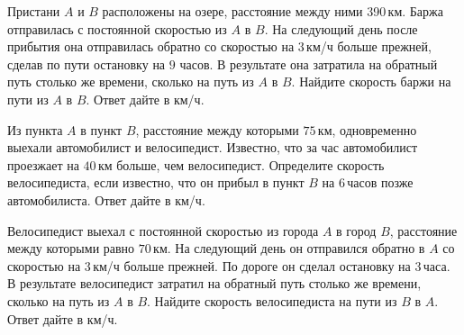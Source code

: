 \begin{class}[number=1]
\begin{listofex}
		\item Пристани \( A \) и \( B \) расположены на озере, расстояние между ними 390 км. Баржа отправилась с постоянной скоростью из \( A \) в \( B \). На следующий день после прибытия она отправилась обратно со скоростью на \( 3 \) км/ч больше прежней, сделав по пути остановку на \( 9 \) часов. В результате она затратила на обратный путь столько же времени, сколько на путь из \( A \) в \( B \). Найдите скорость баржи на пути из \( A \) в \( B \). Ответ дайте в км/ч.
		\item Из пункта \( A \) в пункт \( B \), расстояние между которыми \( 75 \) км, одновременно выехали автомобилист и велосипедист. Известно, что за час автомобилист проезжает на \( 40 \) км больше, чем велосипедист. Определите скорость велосипедиста, если известно, что он прибыл в пункт \( B \) на \( 6 \) часов позже автомобилиста. Ответ дайте в км/ч.
		\item Велосипедист выехал с постоянной скоростью из города \( A \) в город \( B \), расстояние между которыми равно \( 70 \) км. На следующий день он отправился обратно в \( A \) со скоростью на \( 3 \) км/ч больше прежней. По дороге он сделал остановку на \( 3 \) часа. В результате велосипедист затратил на обратный путь столько же времени, сколько на путь из \( A \) в \( B \). Найдите скорость велосипедиста на пути из \( B \) в \( A \). Ответ дайте в км/ч.
	\end{listofex}
\end{class}
%
%
